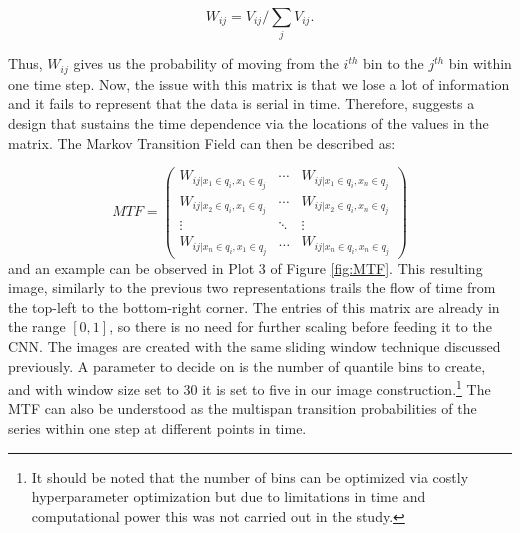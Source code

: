 \documentclass[12pt, a4paper]{article}
\begin{document}
\begin{equation}
\label{eq:W}
    W_{ij} = V_{ij}/\sum_j V_{ij}.
\end{equation}

Thus, $W_{ij}$ gives us the probability of moving from the $i^{th}$ bin to the $j^{th}$ bin within one time step. Now, the issue with this matrix is that we lose a lot of information and it fails to represent that the data is serial in time. Therefore, \cite{wang2015encoding} suggests a design that sustains the time dependence via the locations of the values in the matrix. The Markov Transition Field can then be described as:

\begin{equation}
    \label{eq:MTF}
        MTF =\begin{pmatrix} 
    W_{ij|x_1 \in q_i, x_1 \in q_j} & \cdots & W_{ij|x_1 \in q_i, x_n \in q_j}\\
    W_{ij|x_2 \in q_i, x_1 \in q_j} & \cdots & W_{ij|x_2 \in q_i, x_n \in q_j}\\
    \vdots & \ddots & \vdots\\
    W_{ij|x_n \in q_i, x_1 \in q_j} & \dots & W_{ij|x_n \in q_i, x_n \in q_j}
    \end{pmatrix}
\end{equation}
and an example can be observed in Plot 3 of Figure \ref{fig:MTF}. This resulting image, similarly to the previous two representations trails the flow of time from the top-left to the bottom-right corner.
The entries of this matrix are already in the range $[0,1]$, so there is no need for further scaling before feeding it to the CNN. The images are created with the same sliding window technique discussed previously. A parameter to decide on is the number of quantile bins to create, and with window size set to $30$ it is set to five in our image construction.\footnote{It should be noted that the number of bins can be optimized via costly hyperparameter optimization but due to limitations in time and computational power this was not carried out in the study.}
The MTF can also be understood as the multispan transition probabilities of the series within one step at different points in time.
\end{document}
